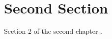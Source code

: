 \section{Second Section}
Section 2 of the second chapter \cite{exemplochapter1sec2} \cite{artigo2024chapter1sec2}.

\printbibliography[heading=subbibliography, title={Referências da Seção 1.2}, keyword=chapter1secao2]